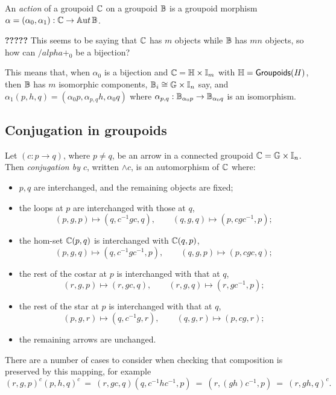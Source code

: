 \begin{defn}
An \emph{action} of a groupoid $\mathbb{C}$ on a groupoid $\mathbb{B}$ 
is a groupoid morphism $\alpha=(\alpha_0,\alpha_1):\mathbb{C}\to\mathbb{A}{\mathrm ut}\,\mathbb{B}$. 
\end{defn}

{\bf ?????}\quad 
This seems to be saying that $\mathbb{C}$ has $m$ objects while $\mathbb{B}$ has $mn$ objects, 
so how can $/alpha+_0$ be a bijection? 

This means that, when $\alpha_0$ is a bijection and 
$\mathbb{C} = \mathbb{H} \times \mathbb{I}_m$ with $\mathbb{H} = {\sf Groupoids}(H)$, 
then $\mathbb{B}$ has $m$ isomorphic components, 
$\mathbb{B}_i \cong \mathbb{G} \times \mathbb{I}_n$ say, 
and $\alpha_1(p,h,q) = (\alpha_0p, \alpha_{p,q}h, \alpha_0q)$ 
where $\alpha_{p,q} : \mathbb{B}_{\alpha_0p} \to \mathbb{B}_{\alpha_0q}$ 
is an isomorphism. 




\subsection{Conjugation in groupoids}


\begin{defn}
Let $(c : p \to q)$, where $p \neq q$, 
be an arrow in a connected groupoid $\mathbb{C} = \mathbb{G} \times \mathbb{I}_n$. 
Then \emph{conjugation by $c$}, written $\wedge c$, 
is an automorphism of $\mathbb{C}$ where: 
\begin{itemize}
\item
$p,q$ are interchanged, and the remaining objects are fixed; 
\item
the loops at $p$ are interchanged with those at $q$, 
$$
(p,g,p) \mapsto (q,c^{-1}gc,q), \qquad 
(q,g,q) \mapsto (p,cgc^{-1},p); 
$$
\item
the hom-set $\mathbb{C}(p,q)$ is interchanged with $\mathbb{C}(q,p)$, 
$$
(p,g,q) \mapsto (q,c^{-1}gc^{-1},p), \qquad 
(q,g,p) \mapsto (p,cgc,q);
$$
\item
the rest of the costar at $p$ is interchanged with that at $q$, 
$$
(r,g,p) \mapsto (r,gc,q), \qquad 
(r,g,q) \mapsto (r,gc^{-1},p);
$$
\item
the rest of the star at $p$ is interchanged with that at $q$, 
$$
(p,g,r) \mapsto (q,c^{-1}g,r), \qquad 
(q,g,r) \mapsto (p,cg,r);
$$
\item
the remaining arrows are unchanged. 
\end{itemize}
\end{defn}
There are a number of cases to consider when checking that composition 
is preserved by this mapping, for example 
$$
(r,g,p)^c(p,h,q)^c 
~=~ (r,gc,q)(q,c^{-1}hc^{-1},p) 
~=~ (r,(gh)c^{-1},p) 
~=~ (r,gh,q)^c. 
$$

